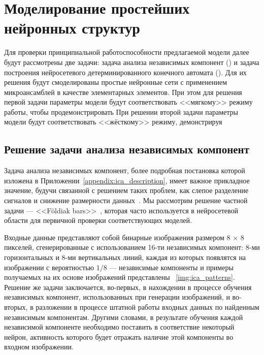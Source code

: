 \section{Моделирование простейших нейронных структур} \label{section:neuron_modeling}

Для проверки принципиальной работоспособности предлагаемой модели далее будут рассмотрены две задачи: задача анализа независимых компонент () и задача построения нейросетевого детерминированного конечного автомата (). Для их решения будут смоделированы простые нейронные сети с применением микроансамблей в качестве элементарных элементов. При этом для решения первой задачи параметры модели будут соответствовать <<мягкому>> режиму работы, чтобы продемонстрировать  При решении второй задачи параметры модели будут соответствовать <<жёсткому>> режиму, демонстрируя


\subsection{Решение задачи анализа независимых компонент}

Задача анализа независимых компонент, более подробная постановка которой изложена в Приложении~\ref{appendix:ica_description}, имеет важное прикладное значение, будучи связанной с решением таких проблем, как слепое разделение сигналов и снижение размерности данных~\cite{Hyvarinen2004}. Мы рассмотрим решение частной задачи  --- <<F{\"o}ldiak bars>>~\cite{Foldiak1990}, которая часто используется в нейросетевой области для первичной проверки соответствующих моделей.

Входные данные представляют собой бинарные изображения размером $8\,\times\,8$ пикселей, сгенерированные с использованием 16-ти независимых компонент: 8-ми горизонтальных и 8-ми вертикальных линий, каждая из которых появлятся на изображении с вероятностью $1/8$ --- независимые компоненты и примеры получаемых на их основе изображений представлены \onfigure~\ref{img:ica_patterns}. Решение же задачи заключается, во-первых, в нахождении в процессе обучения независимых компонент, использованных при генерации изображений, и во-вторых, в разложении в процессе штатной работы входных данных по найденным независимым компонентам. Другими словами, в результате обучения каждой независимой компоненте необходимо поставить в соответствие некоторый нейрон, активность которого будет отражать наличие этой компоненты во входном изображении.


